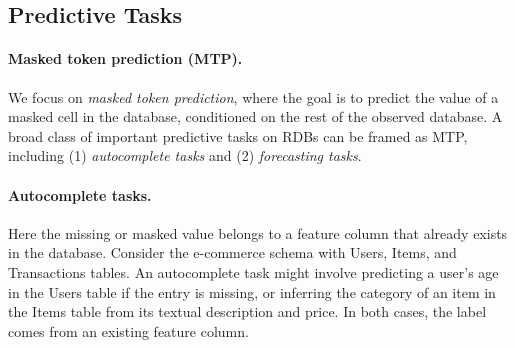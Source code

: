

\subsection{Predictive Tasks}


\paragraph{Masked token prediction (MTP).} We focus on \textit{masked token prediction}, where the goal is to predict the value of a masked cell in the database, conditioned on the rest of the observed database.
A broad class of important predictive tasks on RDBs
can be framed as MTP, including (1) \textit{autocomplete tasks} and (2) \textit{forecasting tasks}.

\paragraph{Autocomplete tasks.} Here the missing or masked value belongs to a feature column that already exists in the database.
Consider the e-commerce schema with Users, Items, and Transactions tables. An autocomplete task might involve predicting a user’s age in the Users table if the entry is missing, or inferring the category of an item in the Items table from its textual description and price. In both cases, the label comes from an existing feature column.


